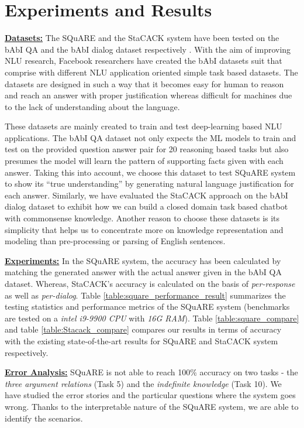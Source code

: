 \documentclass[letterpaper]{article}
\begin{document}
\section{Experiments and Results}

\noindent\textbf{\underline{Datasets:}}
The SQuARE and the StaCACK system have been tested on the bAbI QA \cite{babi} and the bAbI dialog dataset respectively \cite{babi_dialog}. With the aim of improving NLU research, Facebook researchers have created the bAbI datasets suit that comprise with different NLU application oriented simple task based datasets. The datasets are designed in such a way that it becomes easy for human to reason and reach an answer with proper justification whereas difficult for machines due to the lack of understanding about the language.

These datasets are mainly created to train and test deep-learning based NLU applications. The bAbI QA dataset not only expects the ML models to train and test on the provided question answer pair for 20 reasoning based tasks but also presumes the model will learn the pattern of supporting facts given with each answer. Taking this into account, we choose this dataset to test SQuARE system to show its ``true understanding'' by generating natural language justification for each answer. Similarly, we have evaluated the StaCACK approach on the bAbI dialog dataset to exhibit how we can build a closed domain task based chatbot with commonsense knowledge. Another reason to choose these datasets is its simplicity that helps us to concentrate more on knowledge representation and modeling than pre-processing or parsing of English sentences.

\smallskip
\noindent\textbf{\underline{Experiments:}}
In the SQuARE system, the accuracy has been calculated by matching the generated answer with the actual answer given in the bAbI QA dataset. Whereas, StaCACK's accuracy is calculated on the basis of \textit{per-response} as well as \textit{per-dialog}. Table \ref{table:square_performance_result} summarizes the testing statistics and performance metrics of the SQuARE system (benchmarks are tested on a \textit{intel i9-9900 CPU} with \textit{16G RAM}).
Table \ref{table:square_compare} and table \ref{table:Stacack_compare} compares our results in terms of accuracy with the existing state-of-the-art results for SQuARE and StaCACK system respectively.


\smallskip
\noindent\textbf{\underline{Error Analysis:}}
SQuARE is not able to reach 100\% accuracy on two tasks  - the \textit{three argument relations} (Task 5) and the \textit{indefinite knowledge} (Task 10). We have studied the error stories and the particular questions where the system goes wrong. Thanks to the interpretable nature of the SQuARE system, we are able to identify the scenarios.
\end{document}
